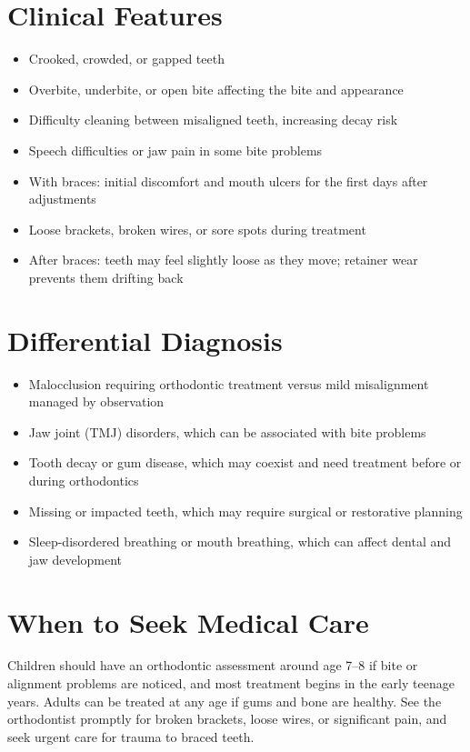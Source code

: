 \section*{Clinical Features}
\begin{itemize}
    \item Crooked, crowded, or gapped teeth
    \item Overbite, underbite, or open bite affecting the bite and appearance
    \item Difficulty cleaning between misaligned teeth, increasing decay risk
    \item Speech difficulties or jaw pain in some bite problems
    \item With braces: initial discomfort and mouth ulcers for the first days after adjustments
    \item Loose brackets, broken wires, or sore spots during treatment
    \item After braces: teeth may feel slightly loose as they move; retainer wear prevents them drifting back
\end{itemize}

\section*{Differential Diagnosis}
\begin{itemize}
    \item Malocclusion requiring orthodontic treatment versus mild misalignment managed by observation
    \item Jaw joint (TMJ) disorders, which can be associated with bite problems
    \item Tooth decay or gum disease, which may coexist and need treatment before or during orthodontics
    \item Missing or impacted teeth, which may require surgical or restorative planning
    \item Sleep-disordered breathing or mouth breathing, which can affect dental and jaw development
\end{itemize}

\section*{When to Seek Medical Care}
Children should have an orthodontic assessment around age 7--8 if bite or alignment problems are noticed, and most treatment begins in the early teenage years. Adults can be treated at any age if gums and bone are healthy. See the orthodontist promptly for broken brackets, loose wires, or significant pain, and seek urgent care for trauma to braced teeth.

